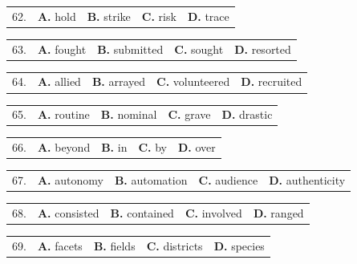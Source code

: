 \documentclass[UTF8,11pt]{ctexart}
\begin{document}
\noindent\begin{tabularx}{\linewidth}{@{}lXXXX@{}}62. & \textbf{A.} hold & \textbf{B.} strike & \textbf{C.} risk & \textbf{D.} trace\\\end{tabularx}\par

\noindent\begin{tabularx}{\linewidth}{@{}lXXXX@{}}63. & \textbf{A.} fought & \textbf{B.} submitted & \textbf{C.} sought & \textbf{D.} resorted\\\end{tabularx}\par

\noindent\begin{tabularx}{\linewidth}{@{}lXXXX@{}}64. & \textbf{A.} allied & \textbf{B.} arrayed & \textbf{C.} volunteered & \textbf{D.} recruited\\\end{tabularx}\par

\noindent\begin{tabularx}{\linewidth}{@{}lXXXX@{}}65. & \textbf{A.} routine & \textbf{B.} nominal & \textbf{C.} grave & \textbf{D.} drastic\\\end{tabularx}\par

\noindent\begin{tabularx}{\linewidth}{@{}lXXXX@{}}66. & \textbf{A.} beyond & \textbf{B.} in & \textbf{C.} by & \textbf{D.} over\\\end{tabularx}\par

\noindent\begin{tabularx}{\linewidth}{@{}lXXXX@{}}67. & \textbf{A.} autonomy & \textbf{B.} automation & \textbf{C.} audience & \textbf{D.} authenticity\\\end{tabularx}\par

\noindent\begin{tabularx}{\linewidth}{@{}lXXXX@{}}68. & \textbf{A.} consisted & \textbf{B.} contained & \textbf{C.} involved & \textbf{D.} ranged\\\end{tabularx}\par

\noindent\begin{tabularx}{\linewidth}{@{}lXXXX@{}}69. & \textbf{A.} facets & \textbf{B.} fields & \textbf{C.} districts & \textbf{D.} species\\\end{tabularx}\par
\end{document}
